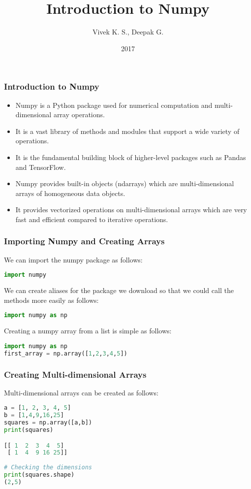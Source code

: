 \documentclass{beamer}
\title{Introduction to Numpy}
\author{Vivek K. S., Deepak G.}
\institute{Information Systems Decision Sciences (ISDS)\\
MUMA College of Business\\
University of South Florida \\
Tampa, Florida}
\date{2017}
\begin{document}
\frame{\titlepage}
\begin{frame}
\frametitle{Introduction to Numpy}
\begin{itemize}
\item Numpy is a Python package used for numerical computation and multi-dimensional array operations.
\item It is a vast library of methods and modules that support a wide variety of operations.
\item It is the  fundamental building block of higher-level packages such as Pandas and TensorFlow.
\item Numpy provides built-in objects (ndarrays) which are multi-dimensional arrays of homogeneous data objects.
\item It provides vectorized operations on multi-dimensional arrays which are very fast and efficient compared to iterative  operations.
\end{itemize}
\end{frame}

\begin{frame}[fragile]
\frametitle{Importing Numpy and Creating Arrays}
We can import the numpy package as follows: \\
\begin{lstlisting}[language=Python]
import numpy
\end{lstlisting}
We can create aliases for the package we download so that we could call the methods more easily as follows:
\begin{lstlisting}[language=Python]
import numpy as np
\end{lstlisting}
Creating a numpy array from a list is simple as follows:
\begin{lstlisting}[language=Python]
import numpy as np
first_array = np.array([1,2,3,4,5])
\end{lstlisting}
\end{frame}

\begin{frame}[fragile]
\frametitle{Creating Multi-dimensional Arrays}
Multi-dimensional arrays can be created as follows:
\begin{lstlisting}[language=Python]
a = [1, 2, 3, 4, 5]
b = [1,4,9,16,25]
squares = np.array([a,b])
print(squares)

[[ 1  2  3  4  5]
 [ 1  4  9 16 25]]
 
# Checking the dimensions
print(squares.shape)
(2,5)
\end{lstlisting}
\end{frame}
\end{document}
